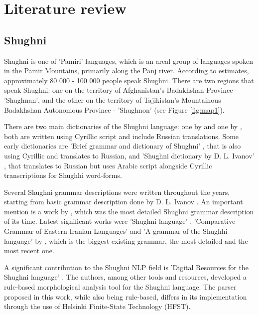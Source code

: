 \section{Literature review}
\subsection{Shughni}
\par Shughni is one of 'Pamiri' languages, which is an areal group of languages spoken in the Pamir Mountains, primarily along the Panj river. According to \textcite{edelman_dodykhudoeva_shughni_2009} estimates, approximately 80 000 - 100 000 people speak Shughni. There are two regions that speak Shughni: one on the territory of Afghanistan's Badakhshan Province - 'Shughnan', and the other on the territory of Tajikistan's Mountainous Badakhshan Autonomous Province - 'Shughnon' \parencite[2]{parker_shughni_2023} (see Figure \ref{fig:map1}).
\par There are two main dictionaries of the Shughni language: one by \textcite{zarubin_dict_1960} and one by \textcite{karamshoev_dict_1988}, both are written using Cyrillic script and include Russian translations. Some early dictionaries are 'Brief grammar and dictionary of Shughni' \parencite{tumanovich_gram_1906}, that is also using Cyrillic and translates to Russian, and 'Shughni dictionary by D. L. Ivanov' \parencite{salemann_dict_1895}, that translates to Russian but uses Arabic script alongside Cyrillic transcriptions for Shughhi word-forms.
\par Several Shughni grammar descriptions were written throughout the years, starting from basic grammar description done by D. L. Ivanov \parencite[274-281]{salemann_dict_1895}. An important mention is a work by \textcite{karamshoev_dialect_1963}, which was the most detailed Shughni grammar description of its time. Latest significant works were 'Shughni language' \parencite[225-242]{edelman_languages_1999}, 'Comparative Grammar of Eastern Iranian Languages' \parencite{edelman_gram_2009} and 'A grammar of the Shughhi language' by \textcite{parker_shughni_2023}, which is the biggest existing grammar, the most detailed and the most recent one.
\par A significant contribution to the Shughni NLP field is 'Digital Resources for the Shughni language' \parencite{makarov_digital_2022}. The authors, among other tools and resources, developed a rule-based morphological analysis tool for the Shughni language. The parser proposed in this work, while also being rule-based, differs in its implementation through the use of Helsinki Finite-State Technology (HFST).

